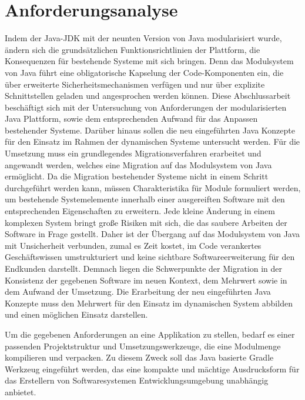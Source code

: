 \section{Anforderungsanalyse} 
	Indem der Java-JDK mit der neunten Version von Java modularisiert wurde, ändern sich die grundsätzlichen Funktionsrichtlinien der Plattform, die Konsequenzen für bestehende Systeme mit sich bringen. Denn das Modulsystem von Java führt eine obligatorische Kapselung der Code-Komponenten ein, die über erweiterte Sicherheitsmechanismen verfügen und nur über explizite Schnittstellen geladen und angesprochen werden können.\newline 
	Diese Abschlussarbeit beschäftigt sich mit der Untersuchung von Anforderungen der modularisierten Java Plattform, sowie dem entsprechenden Aufwand für das Anpassen bestehender Systeme. Darüber hinaus sollen die neu eingeführten Java Konzepte für den Einsatz im Rahmen der dynamischen Systeme untersucht werden.\newline
	Für die Umsetzung muss ein grundlegendes Migrationsverfahren erarbeitet und angewandt werden, welches eine Migration auf das Modulsystem von Java ermöglicht. Da die Migration bestehender Systeme nicht in einem Schritt durchgeführt werden kann, müssen Charakteristika für Module formuliert werden, um bestehende Systemelemente innerhalb einer ausgereiften Software mit den entsprechenden Eigenschaften zu erweitern.\newline
	Jede kleine Änderung in einem komplexen System bringt große Risiken mit sich, die das saubere Arbeiten der Software in Frage gestellt. Daher ist der Übergang auf das Modulsystem von Java mit Unsicherheit verbunden, zumal es Zeit kostet, im Code verankertes Geschäftswissen umstrukturiert und keine sichtbare Softwareerweiterung für den Endkunden darstellt. Demnach liegen die Schwerpunkte der Migration in der Konsistenz der gegebenen Software im neuen Kontext, dem Mehrwert sowie in dem Aufwand der Umsetzung. \newline
	Die Erarbeitung der neu eingeführten Java Konzepte muss den Mehrwert für den Einsatz im dynamischen System abbilden und einen möglichen Einsatz darstellen.

	Um die gegebenen Anforderungen an eine Applikation zu stellen, bedarf es einer passenden Projektstruktur und Umsetzungswerkzeuge, die eine Modulmenge kompilieren und verpacken. Zu diesem Zweck soll das Java basierte Gradle Werkzeug eingeführt werden, das eine kompakte und mächtige Ausdrucksform für das Erstellern von Softwaresystemen Entwicklungsumgebung unabhängig anbietet. \bigbreak

